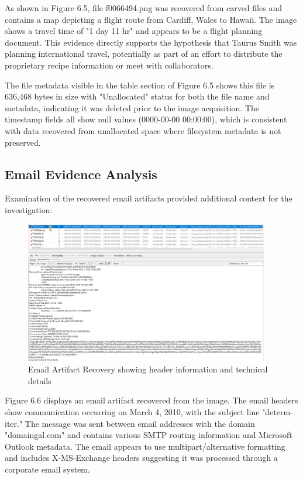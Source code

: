 As shown in Figure 6.5, file f0066494.png was recovered from carved files and contains a map depicting a flight route from Cardiff, Wales to Hawaii. The image shows a travel time of "1 day 11 hr" and appears to be a flight planning document. This evidence directly supports the hypothesis that Taurus Smith was planning international travel, potentially as part of an effort to distribute the proprietary recipe information or meet with collaborators.

The file metadata visible in the table section of Figure 6.5 shows this file is 636,468 bytes in size with "Unallocated" status for both the file name and metadata, indicating it was deleted prior to the image acquisition. The timestamp fields all show null values (0000-00-00 00:00:00), which is consistent with data recovered from unallocated space where filesystem metadata is not preserved.

\subsection{Email Evidence Analysis}
Examination of the recovered email artifacts provided additional context for the investigation:

\begin{figure}[h]
    \centering
    \includegraphics[width=0.95\textwidth]{images/Evidence Examination/Image6.png}
    \caption{Email Artifact Recovery showing header information and technical details}
    \label{fig:email_artifact}
\end{figure}

Figure 6.6 displays an email artifact recovered from the image. The email headers show communication occurring on March 4, 2010, with the subject line "determ-iter." The message was sent between email addresses with the domain "domaingal.com" and contains various SMTP routing information and Microsoft Outlook metadata. The email appears to use multipart/alternative formatting and includes X-MS-Exchange headers suggesting it was processed through a corporate email system.

